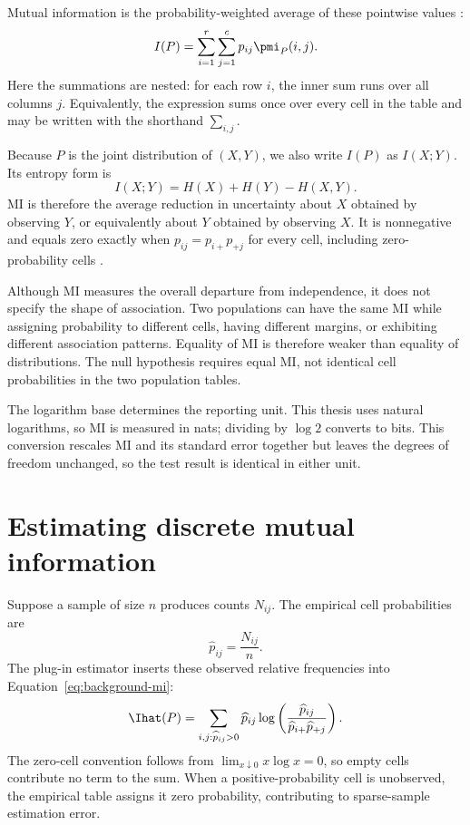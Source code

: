 Mutual information is the probability-weighted average of these pointwise
values \citep{shannon1948,bossomaier2016}:
\begin{equation}
  I(P)
  =\sum_{i=1}^{r}\sum_{j=1}^{c}p_{ij}\pmi_P(i,j).
  \label{eq:background-mi}
\end{equation}
Here the summations are nested: for each row \(i\), the inner sum runs over
all columns \(j\). Equivalently, the expression sums once over every cell in
the table and may be written with the shorthand \(\sum_{i,j}\).

Because \(P\) is the joint distribution of \((X,Y)\), we also write
\(I(P)\) as \(I(X;Y)\). Its entropy form is
\begin{equation}
  I(X;Y)=H(X)+H(Y)-H(X,Y).
  \label{eq:mi-entropy-form}
\end{equation}
MI is therefore the average reduction in uncertainty about \(X\) obtained
by observing \(Y\), or equivalently about \(Y\) obtained by observing \(X\).
It is nonnegative and equals zero exactly when
\(p_{ij}=p_{i+}p_{+j}\) for every cell, including zero-probability cells
\citep{bossomaier2016}.

Although MI measures the overall departure from independence, it does not
specify the shape of association. Two populations can have the same MI while assigning
probability to different cells, having different margins, or exhibiting
different association patterns. Equality of MI is therefore weaker than
equality of distributions. The null hypothesis requires equal MI, not
identical cell probabilities in the two population tables.

The logarithm base determines the reporting unit. This thesis uses natural
logarithms, so MI is measured in nats; dividing by \(\log 2\) converts to bits.
This conversion rescales MI and its standard error together but leaves the
degrees of freedom unchanged, so the test result is identical in either unit.

\section{Estimating discrete mutual information}
\label{sec:background-mi-bias}

Suppose a sample of size \(n\) produces counts \(N_{ij}\). The empirical cell
probabilities are
\begin{equation}
  \widehat p_{ij}=\frac{N_{ij}}{n}.
\end{equation}
The plug-in estimator inserts these observed relative frequencies into
Equation~\eqref{eq:background-mi}:
\begin{equation}
  \Ihat(P)
  =\sum_{i,j:\widehat p_{ij}>0}
  \widehat p_{ij}
  \log\left(
  \frac{\widehat p_{ij}}
       {\widehat p_{i+}\widehat p_{+j}}
  \right).
  \label{eq:plugin-mi-background}
\end{equation}
The zero-cell convention follows from
\(\lim_{x\downarrow0}x\log x=0\), so empty cells contribute no term to
the sum. When a positive-probability cell is unobserved, the empirical
table assigns it zero probability, contributing to sparse-sample estimation
error.

